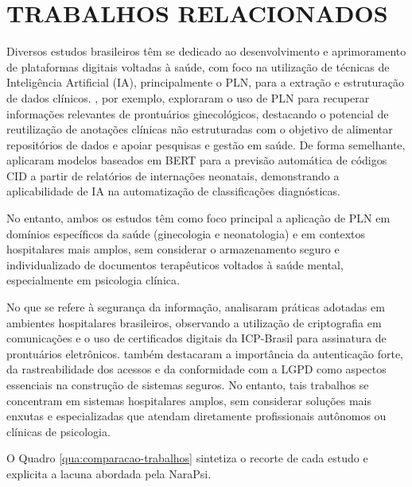 \section{TRABALHOS RELACIONADOS}

Diversos estudos brasileiros têm se dedicado ao desenvolvimento e aprimoramento de plataformas digitais voltadas à saúde, com foco na utilização de técnicas de Inteligência Artificial (IA), principalmente o PLN, para a extração e estruturação de dados clínicos. , por exemplo, exploraram o uso de PLN para recuperar informações relevantes de prontuários ginecológicos, destacando o potencial de reutilização de anotações clínicas não estruturadas com o objetivo de alimentar repositórios de dados e apoiar pesquisas e gestão em saúde. De forma semelhante,  aplicaram modelos baseados em BERT para a previsão automática de códigos CID a partir de relatórios de internações neonatais, demonstrando a aplicabilidade de IA na automatização de classificações diagnósticas.

No entanto, ambos os estudos têm como foco principal a aplicação de PLN em domínios específicos da saúde (ginecologia e neonatologia) e em contextos hospitalares mais amplos, sem considerar o armazenamento seguro e individualizado de documentos terapêuticos voltados à saúde mental, especialmente em psicologia clínica.

No que se refere à segurança da informação,  analisaram práticas adotadas em ambientes hospitalares brasileiros, observando a utilização de criptografia em comunicações e o uso de certificados digitais da ICP-Brasil para assinatura de prontuários eletrônicos.  também destacaram a importância da autenticação forte, da rastreabilidade dos acessos e da conformidade com a LGPD como aspectos essenciais na construção de sistemas seguros. No entanto, tais trabalhos se concentram em sistemas hospitalares amplos, sem considerar soluções mais enxutas e especializadas que atendam diretamente profissionais autônomos ou clínicas de psicologia.

O Quadro \ref{qua:comparacao-trabalhos} sintetiza o recorte de cada estudo e explicita a lacuna abordada pela NaraPsi.

